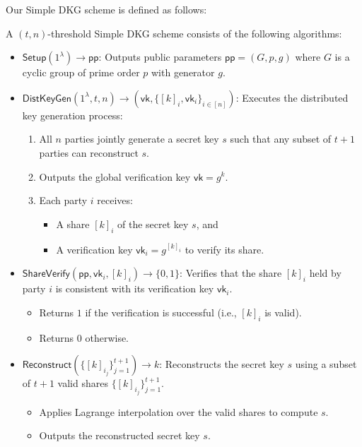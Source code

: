 Our Simple DKG scheme is defined as follows:
\begin{definition}
A $(t,n)$-threshold Simple DKG scheme consists of the following algorithms:
\begin{itemize}
\item $\mathsf{Setup}(1^{\lambda}) \to \mathsf{pp}$: 
  Outputs public parameters $\mathsf{pp} = (G, p, g)$ where $G$ is a cyclic group of prime order $p$ with generator $g$.
  
\item $\mathsf{DistKeyGen}(1^{\lambda}, t, n) \to (\mathsf{vk}, \{[k]_i, \mathsf{vk}_i\}_{i \in [n]})$: 
  Executes the distributed key generation process:
  \begin{enumerate}
    \item All $n$ parties jointly generate a secret key $s$ such that any subset of $t+1$ parties can reconstruct $s$.
    \item Outputs the global verification key $\mathsf{vk} = g^k$.
    \item Each party $i$ receives:
      \begin{itemize}
        \item A share $[k]_i$ of the secret key $s$, and
        \item A verification key $\mathsf{vk}_i = g^{[k]_i}$ to verify its share.
      \end{itemize}
  \end{enumerate}

\item $\mathsf{ShareVerify}(\mathsf{pp}, \mathsf{vk}_i, [k]_i) \to \{0,1\}$: 
  Verifies that the share $[k]_i$ held by party $i$ is consistent with its verification key $\mathsf{vk}_i$.
  \begin{itemize}
    \item Returns $1$ if the verification is successful (i.e., $[k]_i$ is valid).
    \item Returns $0$ otherwise.
  \end{itemize}

\item $\mathsf{Reconstruct}(\{[k]_{i_j}\}_{j=1}^{t+1}) \to k$: 
  Reconstructs the secret key $s$ using a subset of $t+1$ valid shares $\{[k]_{i_j}\}_{j=1}^{t+1}$. 
  \begin{itemize}
    \item Applies Lagrange interpolation over the valid shares to compute $s$.
    \item Outputs the reconstructed secret key $s$.
  \end{itemize}
\end{itemize}
\end{definition}

